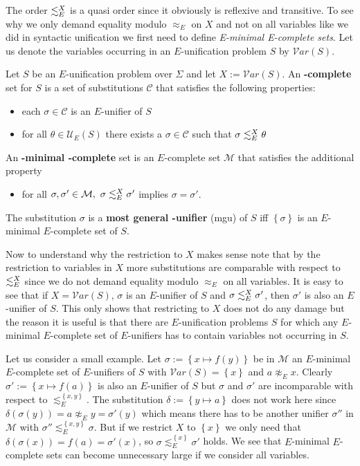 The order $\lesssim^X_E$ is a quasi order since it obviously is reflexive and transitive. To see why we only demand equality modulo $\approx_E$ on $X$ and not on all variables like we did in syntactic unification we first need to define \emph{E-minimal E-complete sets}.
Let us denote the variables occurring in an $E$-unification problem $S$ by $\mathcal{V}ar(S)$.
\begin{definition}
	Let $S$ be an $E$-unification problem over $\Sigma$ and let $X:=\mathcal{V}ar(S)$. An \textbf{\mBold-complete} set for $S$ is a set of substitutions $\mathcal{C}$ that satisfies the following properties:
	\begin{itemize}
		\item each $\sigma \in \mathcal{C}$ is an $E$-unifier of $S$
		\item for all $\theta \in\mathcal{U}_E(S)$ there exists a $\sigma \in \mathcal{C}$ such that $\sigma\lesssim^X_E\theta$
	\end{itemize}
	An \textbf{\mBold-minimal \mBold-complete} set is an $E$-complete set  $\mathcal{M}$ that satisfies the additional property
	\begin{itemize}
		\item for all $\sigma,\sigma'\in\mathcal{M},\ \sigma\moreGeneral\sigma'$ implies $\sigma=\sigma'$.
	\end{itemize}
	The substitution $\sigma$ is a \textbf{most general \mBold-unifier} (mgu) of $S$ iff $\left\lbrace \sigma\right\rbrace$ is an $E$-minimal $E$-complete set of $S$.
\end{definition}
Now to understand why the restriction to $X$ makes sense note that by the restriction to variables in $X$ more substitutions are comparable with respect to $\lesssim^X_E$ since we do not demand equality modulo $\approx_E$ on all variables. It is easy to see that if $X=\mathcal{V}ar(S)$, $\sigma$ is an $E$-unifier of $S$ and $\sigma\lesssim^X_E\sigma'$, then $\sigma'$ is also an $E$-unifier of $S$. This only shows that restricting to $X$ does not do any damage but the reason it is useful is that there are $E$-unification problems $S$ for which any $E$-minimal $E$-complete set of $E$-unifiers has to contain variables not occurring in $S$. 

Let us consider a small example. Let $\sigma:=\left\lbrace x\mapsto f(y)\right\rbrace$ be in $\mathcal{M}$ an $E$-minimal $E$-complete set of $E$-unifiers of $S$ with $\mathcal{V}ar(S)=\left\lbrace x\right\rbrace$ and $ a\not\approx_E x$. Clearly $\sigma':=\left\lbrace x\mapsto f(a)\right\rbrace$ is also an $E$-unifier of $S$ but $\sigma$ and $\sigma'$ are incomparable with respect to $\lesssim^{\left\lbrace x,y\right\rbrace }_E$. The substitution $\delta:=\left\lbrace y\mapsto a\right\rbrace $ does not work here since $\delta(\sigma(y))=a \not\approx_E y=\sigma'(y)$ which means there has to be another unifier $\sigma''$ in $\mathcal{M}$ with $\sigma''\lesssim^{\left\lbrace x,y\right\rbrace }_E\sigma$. But if we restrict $X$ to $\left\lbrace x\right\rbrace $ we only need that $\delta(\sigma(x))=f(a)=\sigma'(x)$, so $\sigma\lesssim^{\left\lbrace x\right\rbrace }_E\sigma'$ holds. We see that $E$-minimal $E$-complete sets can become unnecessary large if we consider all variables.

